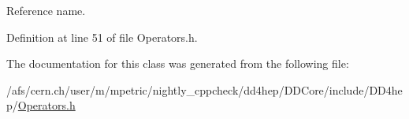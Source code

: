 Reference name. 



Definition at line 51 of file Operators.\+h.



The documentation for this class was generated from the following file\+:\begin{DoxyCompactItemize}
\item 
/afs/cern.\+ch/user/m/mpetric/nightly\+\_\+cppcheck/dd4hep/\+D\+D\+Core/include/\+D\+D4hep/\hyperlink{_operators_8h}{Operators.\+h}\end{DoxyCompactItemize}
